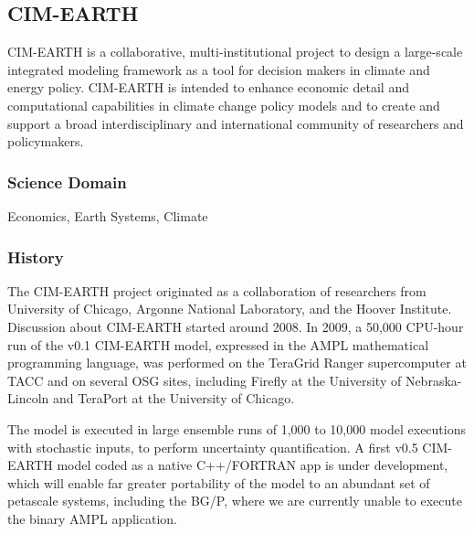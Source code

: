 \documentclass[10pt,letterpaper]{article}
\begin{document}
\subsection{CIM-EARTH}


CIM-EARTH is a collaborative, multi-institutional project to design a large-scale integrated modeling framework as a tool for decision makers in climate and energy policy. CIM-EARTH is intended to enhance economic detail and computational capabilities in climate change policy models and to create and support a broad interdisciplinary and international community of researchers and policymakers.

\subsubsection{Science Domain} Economics, Earth Systems, Climate

\subsubsection{History}
The CIM-EARTH project originated as a collaboration of researchers from University of Chicago, Argonne National Laboratory, and the Hoover Institute. Discussion about CIM-EARTH started around 2008. In 2009, a 50,000 CPU-hour run of the v0.1 CIM-EARTH model, expressed in the AMPL mathematical programming language, was performed on the TeraGrid Ranger supercomputer at TACC and on several OSG sites, including Firefly at the University of Nebraska-Lincoln and TeraPort at the University of Chicago.

The model is executed in large ensemble runs of 1,000 to 10,000 model executions with stochastic inputs, to perform uncertainty quantification.
A first v0.5 CIM-EARTH model coded as a native C++/FORTRAN app is under development, which will enable far greater portability of the model to an abundant set of petascale systems, including the BG/P, where we are currently unable to execute the binary AMPL application. 
\end{document}
